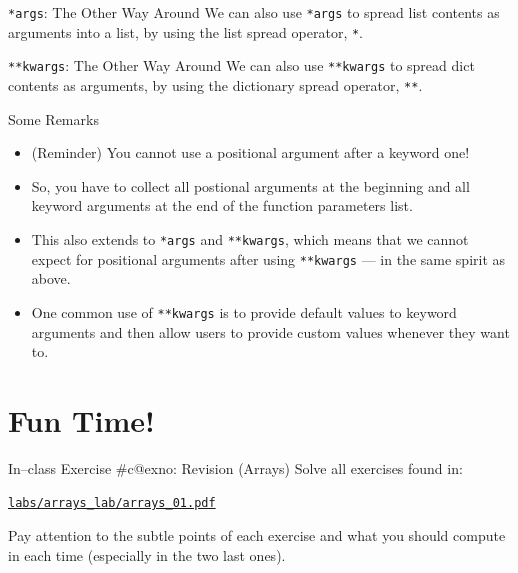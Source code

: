 \documentclass[aspectratio=169, 12pt, xcolor=table]{beamer}
\makeatletter
\newcommand{\ohref}[1]{\href{#1}{\texttt{#1}}}
\newcommand{\arabicthree}[1]{\expandafter\@arabicthree\csname c@#1\endcsname}
\newcommand{\@arabicthree}[1]{\ifnum #1<100 0\fi\ifnum #1<10 0\fi\number#1}
\newcounter{exno}
\newcommand{\exno}{\stepcounter{exno}In--class Exercise \#\arabicthree{exno}}
\makeatother
\begin{document}
	\begin{frame}{\texttt{*args}: The Other Way Around}
		We can also use \texttt{*args} to spread list contents as arguments into a list, by using the list spread operator, \texttt{*}.
		
	\end{frame}

	\begin{frame}{\texttt{**kwargs}: The Other Way Around}
		We can also use \texttt{**kwargs} to spread dict contents as arguments, by using the dictionary spread operator, \texttt{**}.
		
	\end{frame}

	\begin{frame}{Some Remarks}
		\begin{itemize}
			\item (Reminder) You cannot use a positional argument after a keyword one!
			\item So, you have to collect all postional arguments at the beginning and all keyword arguments at the end of the function parameters list.
			\item This also extends to \texttt{*args} and \texttt{**kwargs}, which means that we cannot expect for positional arguments after using \texttt{**kwargs} --- in the same spirit as above.
			\item One common use of \texttt{**kwargs} is to provide default values to keyword arguments and then allow users to provide custom values whenever they want to.
		\end{itemize}
	\end{frame}
	
	\section{Fun Time!}\label{sec:fun-time}
	
	\sectionframe
	
	\setcounter{exno}{0}
	
	\begin{frame}{\exno: Revision (Arrays)}
		Solve all exercises found in:
		\begin{center}
			\ohref{labs/arrays\_lab/arrays\_01.pdf}
		\end{center}
		Pay attention to the subtle points of each exercise and what you should compute in each time (especially in the two last ones).
	\end{frame}
\end{document}
